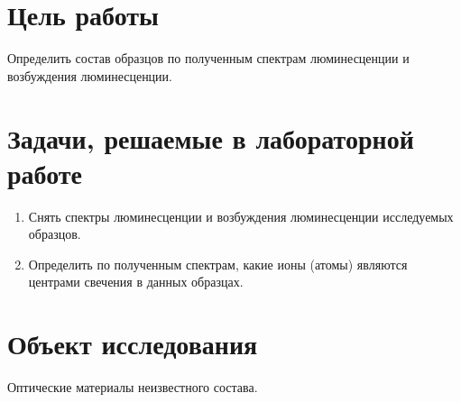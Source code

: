 
\section{Цель работы}\label{sec:purpose}


Определить состав образцов по полученным спектрам люминесценции и возбуждения люминесценции.

\section{Задачи, решаемые в лабораторной работе}\label{sec:tasks}
\begin{enumerate}
	\item Снять спектры люминесценции и возбуждения люминесценции исследуемых образцов.
	\item Определить по полученным спектрам, какие ионы (атомы) являются центрами свечения в данных образцах.
\end{enumerate}

\section{Объект исследования}\label{sec:object}

Оптические материалы неизвестного состава.

